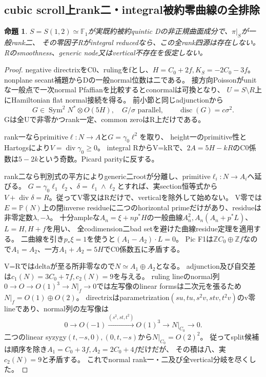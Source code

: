 \documentclass[a4paper,11pt]{ltjsarticle}
\newtheorem{proposition}{命題}[section]
\theoremstyle{definition}
\begin{document}
\subsection{cubic scroll上rank二・integral被約零曲線の全排除}
\begin{proposition}\label{prop:cubic-scroll-ranktwo-integral-R-empty}
$S=S(1,2)\simeq\mathbb F_1$が実既約被約quintic Dの非正規曲面成分で、$\pi|_S$が一般rank二、
その零因子Rがintegral reducedなら、この全rank四源は存在しない。
Rのsmoothness、generic node又はvertical不存在を仮定しない。
\end{proposition}
\begin{proof}
negative directrixをC0、rulingをfとし、$H=C_0+2f,K_S=-2C_0-3f$。
nonplane secant補題からDの一般normal位数は二である。
接方向Poissonがunitな一般点で一次normal Pfaffianを比較するとconormalは可換となり、
$U=S\setminus R$上にHamiltonian flat normal接続を得る。
前小節と同じadjunctionから
\[
 G\in\operatorname{Sym}^2N^*\otimes O(5H),\quad G/\sigma\text{ parallel},
 \qquad\operatorname{disc}(G)=c\sigma^2.
\]
Gは全Uで非零かつrank一定、common zeroはR上だけである。

rank一ならprimitive$\ell:N\to A$と$G=\gamma_0\ell^2$を取り、
height一のprimitive性とHartogsにより$V=\operatorname{div}\gamma_0\ge0$。
integral RからV=kRで、$2A=5H-kR$のC0係数は$5-2k$という奇数。Picard parityに反する。

rank二なら判別式の平方によりgeneric二rootが分離し、primitive$\ell_i:N\to A_i$へ延びる。
$G=\gamma_0\ell_1\ell_2$、$\delta=\ell_1\wedge\ell_2$とすれば、実section恒等式から
$V+\operatorname{div}\delta=R$。従ってV零又はRだけで、verticalを除外して始めない。
V零では$E=\mathbb P(N)$上の閉inverse residueに二つのhorizontal primeだけがあり、residueは非零定数$\lambda,-\lambda$。
十分ampleな$A_n=\xi+np^*H$の一般曲線$A_n^2,A_n(A_n+p^*L)$、$L=H,H+f$を用い、
全codimension二bad setを避けた曲線residue定理を適用する。
二曲線を引き$p_*\xi=1$を使うと$(A_1-A_2)\cdot L=0$。
Pic F1は$\mathbb ZC_0\oplus\mathbb Zf$なので$A_1=A_2$、一方$A_1+A_2=5H$でC0係数五に矛盾する。

V=Rではdeltaが至る所非零なので$N\simeq A_1\oplus A_2$となる。
adjunction及び自交差は$c_1(N)=3C_0+7f,c_2(N)=9$を与える。
ruling lineのnormal列
$0\to O\to O(1)^3\to N|_f\to0$では左写像のlinear formsは二次元を張るため$N|_f=O(1)\oplus O(2)$。
directrixはparametrization$(su,tu,s^2v,stv,t^2v)$のv零lineであり、normal列の左写像は
\[
 0\longrightarrow O(-1)\overset{(s^2,st,t^2)}\longrightarrow O(1)^3
          \longrightarrow N|_{C_0}\longrightarrow0.
\]
二つのlinear syzygy$(t,-s,0),(0,t,-s)$から$N|_{C_0}=O(2)^2$。
従ってsplit候補は順序を除き$A_1=C_0+3f,A_2=2C_0+4f$だけだが、
その積は八、実$c_2(N)=9$と矛盾する。
これでnormal rank一・二及び全vertical分岐を尽くした。
\end{proof}
\end{document}
